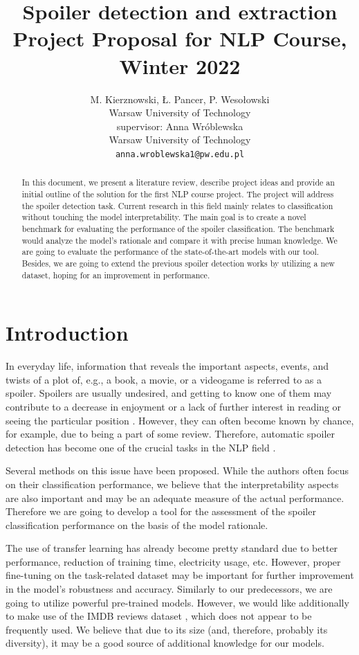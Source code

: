\documentclass[11pt]{article}
\title{Spoiler detection and extraction\\Project Proposal for NLP Course, Winter 2022}
\author{M. Kierznowski, Ł. Pancer, P. Wesołowski \\
  Warsaw University of Technology \\
  \And
    supervisor: Anna Wróblewska \\
  Warsaw University of Technology \\
    {\tt anna.wroblewska1@pw.edu.pl}
    }
\date{}
\begin{document}
\maketitle
\begin{abstract}
In this document, we present a literature review, describe project ideas and provide an initial outline of the solution for the first NLP course project. The project will address the spoiler detection task. Current research in this field mainly relates to classification without touching the model interpretability. The main goal is to create a novel benchmark for evaluating the performance of the spoiler classification. The benchmark would analyze the model's rationale and compare it with precise human knowledge. We are going to evaluate the performance of the state-of-the-art models with our tool. Besides, we are going to extend the previous spoiler detection works by utilizing a new dataset, hoping for an improvement in performance.

\end{abstract}

\section{Introduction}
In everyday life, information that reveals the important aspects, events, and twists of a plot of, e.g., a book, a movie, or a videogame is referred to as a spoiler. Spoilers are usually undesired, and getting to know one of them may contribute to a decrease in enjoyment \cite{abbott2020can} or a lack of further interest in reading or seeing the particular position \cite{li2022exploring}. However, they can often become known by chance, for example, due to being a part of some review. Therefore, automatic spoiler detection has become one of the crucial tasks in the NLP field \cite{guo2010finding}.

Several methods on this issue have been proposed. While the authors often focus on their classification performance, we believe that the interpretability aspects are also important and may be an adequate measure of the actual performance. Therefore we are going to develop a tool for the assessment of the spoiler classification performance on the basis of the model rationale.

The use of transfer learning has already become pretty standard due to better performance, reduction of training time, electricity usage, etc. However, proper fine-tuning on the task-related dataset may be important for further improvement in the model's robustness and accuracy. Similarly to our predecessors, we are going to utilize powerful pre-trained models. However, we would like additionally to make use of the IMDB reviews dataset \cite{enam_biswas_2021}, which does not appear to be frequently used. We believe that due to its size (and, therefore, probably its diversity), it may be a good source of additional knowledge for our models.
\end{document}

